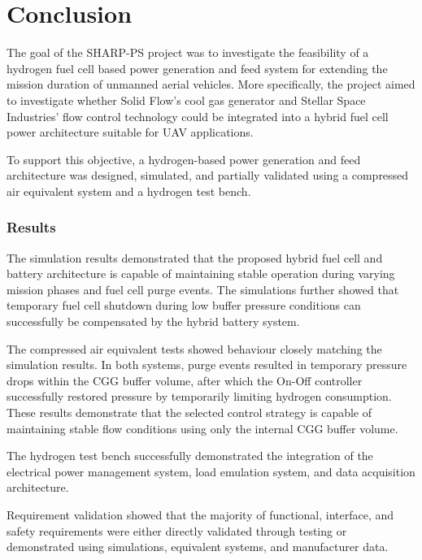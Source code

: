 
\chapter{Conclusion}
\newpage
The goal of the SHARP-PS project was to investigate the feasibility of a hydrogen fuel cell based power generation and feed system for extending the mission duration of unmanned aerial vehicles. More specifically, the project aimed to investigate whether Solid Flow's cool gas generator and Stellar Space Industries' flow control technology could be integrated into a hybrid fuel cell power architecture suitable for UAV applications.

To support this objective, a hydrogen-based power generation and feed architecture was designed, simulated, and partially validated using a compressed air equivalent system and a hydrogen test bench.



\subsection*{Results}
The simulation results demonstrated that the proposed hybrid fuel cell and battery architecture is capable of maintaining stable operation during varying mission phases and fuel cell purge events. The simulations further showed that temporary fuel cell shutdown during low buffer pressure conditions can successfully be compensated by the hybrid battery system.

The compressed air equivalent tests showed behaviour closely matching the simulation results. In both systems, purge events resulted in temporary pressure drops within the CGG buffer volume, after which the On-Off controller successfully restored pressure by temporarily limiting hydrogen consumption. These results demonstrate that the selected control strategy is capable of maintaining stable flow conditions using only the internal CGG buffer volume.

The hydrogen test bench successfully demonstrated the integration of the electrical power management system, load emulation system, and data acquisition architecture.

Requirement validation showed that the majority of functional, interface, and safety requirements were either directly validated through testing or demonstrated using simulations, equivalent systems, and manufacturer data.



